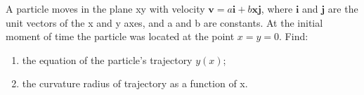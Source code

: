 
\item A particle moves in the plane xy with velocity \(\mathbf{v} = a\mathbf{i} + b\mathbf{x}\mathbf{j}\), where \(\mathbf{i}\) and \(\mathbf{j}\) are the unit vectors of the x and y axes, and a and b are constants. At the initial moment of time the particle was located at the point \(x = y = 0\). Find:
    \begin{enumerate}
        \item the equation of the particle's trajectory \(y(x)\);
        \item the curvature radius of trajectory as a function of x.
    \end{enumerate}
